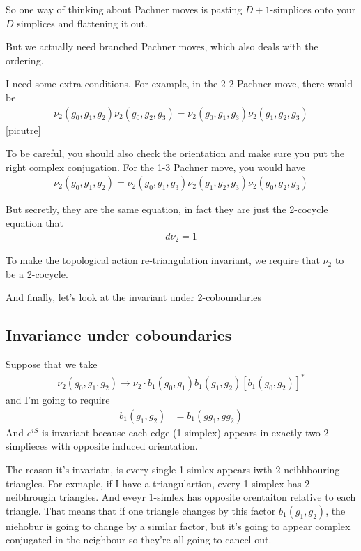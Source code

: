 So one way of thinking about Pachner moves is pasting $D+1$-simplices onto your
$D$ simplices and flattening it out.


But we actually need branched Pachner moves,
which also deals with the ordering.

I need some extra conditions.
For example,
in the 2-2 Pachner move,
there would be
\begin{align}
    \nu_2 (g_0, g_1, g_2)
    \nu_2 (g_0, g_2, g_3)
    =
    \nu_2 (g_0, g_1, g_3)
    \nu_2 (g_1, g_2, g_3)
\end{align}
[picutre]

To be careful,
you should also check the orientation and make sure you put the right complex
conjugation.
For the 1-3 Pachner move,
you would have
\begin{align}
    \nu_2(g_0, g_1, g_2) =
    \nu_2(g_0, g_1, g_3)
    \nu_2(g_1, g_2, g_3)
    \nu_2(g_0, g_2, g_3)
\end{align}

But secretly,
they are the same equation,
in fact they are just the 2-cocycle equation that
\begin{align}
    d\nu_2 = 1
\end{align}

To make the topological action re-triangulation invariant,
we require that $\nu_2$ to be a 2-cocycle.

And finally,
let's look at the invariant under 2-coboundaries

\subsection{Invariance under coboundaries}
Suppose that we take
\begin{align}
    \nu_2 (g_0, g_1, g_2)
    \to
    \nu_2 \cdot 
    b_1 (g_0, g_1)
    b_1 (g_1, g_2)
    \left[ b_1 (g_0, g_2) \right]^*
\end{align}
and I'm going to require
\begin{align}
    b_1 (g_1, g_2) &= b_1 (gg_1, gg_2)
\end{align}
And $e^{iS}$ is invariant because each edge (1-simplex) appears in exactly two
2-simplieces with opposite induced orientation.

The reason it's invariatn, is every single 1-simlex appears iwth 2 neibhbouring
triangles.
For exmaple, if I have a triangulartion,
every 1-simplex has 2 neibhrougin triangles.
And eveyr 1-simlex has opposite orentaiton relative to each triangle.
That means that if one triangle changes by this factor $b_1(g_1,g_2)$,
the niehobur is going to change by a similar factor,
but it's going to appear complex conjugated in the neighbour so they're all going
to cancel out.

